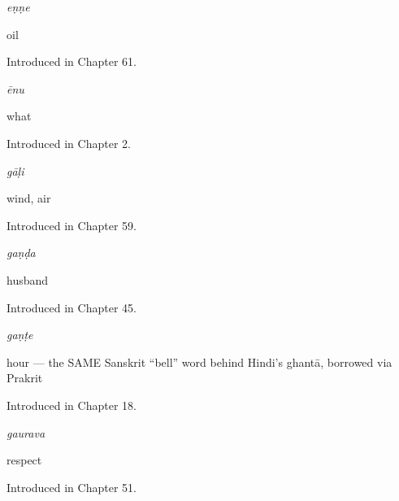 \noindent\begin{minipage}[t]{\linewidth}
\raggedright
\textbf{}\enspace\emph{eṇṇe}\par
\small oil\par
\footnotesize Introduced in Chapter 61.
\end{minipage}\par\medskip

\noindent\begin{minipage}[t]{\linewidth}
\raggedright
\textbf{}\enspace\emph{ēnu}\par
\small what\par
\footnotesize Introduced in Chapter 2.
\end{minipage}\par\medskip

\noindent\begin{minipage}[t]{\linewidth}
\raggedright
\textbf{}\enspace\emph{gāḷi}\par
\small wind, air\par
\footnotesize Introduced in Chapter 59.
\end{minipage}\par\medskip

\noindent\begin{minipage}[t]{\linewidth}
\raggedright
\textbf{}\enspace\emph{gaṇḍa}\par
\small husband\par
\footnotesize Introduced in Chapter 45.
\end{minipage}\par\medskip

\noindent\begin{minipage}[t]{\linewidth}
\raggedright
\textbf{}\enspace\emph{gaṇṭe}\par
\small hour — the SAME Sanskrit \textquotedblleft{}bell\textquotedblright{} word behind Hindi's ghantā, borrowed via Prakrit\par
\footnotesize Introduced in Chapter 18.
\end{minipage}\par\medskip

\noindent\begin{minipage}[t]{\linewidth}
\raggedright
\textbf{}\enspace\emph{gaurava}\par
\small respect\par
\footnotesize Introduced in Chapter 51.
\end{minipage}\par\medskip

